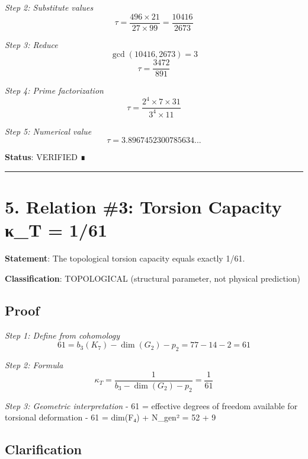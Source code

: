 \documentclass[11pt,a4paper]{article}
\begin{document}
\emph{Step 2: Substitute values} \[\tau = \frac{496 \times 21}{27 \times 99} = \frac{10416}{2673}\]

\emph{Step 3: Reduce} \[\gcd(10416, 2673) = 3\] \[\tau = \frac{3472}{891}\]

\emph{Step 4: Prime factorization} \[\tau = \frac{2^4 \times 7 \times 31}{3^4 \times 11}\]

\emph{Step 5: Numerical value} \[\tau = 3.8967452300785634...\]

\textbf{Status}: VERIFIED ∎

\begin{center}\rule{\linewidth}{0.5pt}\end{center}

\section{5. Relation \#3: Torsion Capacity κ\_\allowbreak{}T = 1/61}\label{relation-3-torsion-capacity-ux3ba_t-161}

\textbf{Statement}: The topological torsion capacity equals exactly 1/61.

\textbf{Classification}: TOPOLOGICAL (structural parameter, not physical prediction)

\subsection{Proof}\label{proof-1}

\emph{Step 1: Define from cohomology} \[61 = b_3(K_7) - \dim(G_2) - p_2 = 77 - 14 - 2 = 61\]

\emph{Step 2: Formula} \[\kappa_T = \frac{1}{b_3 - \dim(G_2) - p_2} = \frac{1}{61}\]

\emph{Step 3: Geometric interpretation} - 61 = effective degrees of freedom available for torsional deformation - 61 = dim(F₄) + N\_\allowbreak{}gen² = 52 + 9

\subsection{Clarification}\label{clarification}
\end{document}
